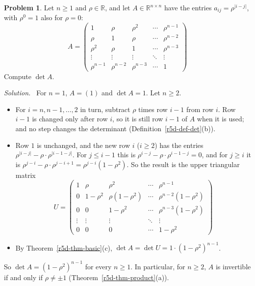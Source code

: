 \documentclass[12pt]{article}
\newcommand{\R}{\mathbb R}
\theoremstyle{definition}
\newtheorem{problem}{Problem}
\newenvironment{solution}{\par\noindent\textit{Solution.}\ }{\par\smallskip}
\begin{document}
\begin{problem}\label{r5d-ex-pr-ar1}
Let \(n\geqslant1\) and \(\rho\in\R\), and let \(A\in\R^{n\times n}\) have the entries \(a_{ij}=\rho^{\lvert i-j\rvert}\), with
\(\rho^0=1\) also for \(\rho=0\):
\[
A=\begin{pmatrix}1&\rho&\rho^2&\cdots&\rho^{n-1}\\\rho&1&\rho&\cdots&\rho^{n-2}\\\rho^2&\rho&1&\cdots&\rho^{n-3}\\
\vdots&\vdots&\vdots&\ddots&\vdots\\\rho^{n-1}&\rho^{n-2}&\rho^{n-3}&\cdots&1\end{pmatrix}
\]
Compute \(\det A\).
\end{problem}
\begin{solution}
For \(n=1\), \(A=(1)\) and \(\det A=1\). Let \(n\geqslant2\).
\begin{itemize}
\item For \(i=n,n-1,\dots,2\) in turn, subtract \(\rho\) times row \(i-1\) from row \(i\). Row \(i-1\) is changed only after
row \(i\), so it is still row \(i-1\) of \(A\) when it is used; and no step changes the determinant
(Definition~\ref{r5d-def-det}(b)).
\item Row \(1\) is unchanged, and the new row \(i\) (\(i\geqslant2\)) has the entries
\(\rho^{\lvert i-j\rvert}-\rho\cdot\rho^{\lvert i-1-j\rvert}\). For \(j\leqslant i-1\) this is
\(\rho^{i-j}-\rho\cdot\rho^{i-1-j}=0\), and for \(j\geqslant i\) it is \(\rho^{j-i}-\rho\cdot\rho^{j-i+1}=\rho^{j-i}(1-\rho^2)\).
So the result is the upper triangular matrix
\[
U=\begin{pmatrix}1&\rho&\rho^2&\cdots&\rho^{n-1}\\0&1-\rho^2&\rho(1-\rho^2)&\cdots&\rho^{n-2}(1-\rho^2)\\
0&0&1-\rho^2&\cdots&\rho^{n-3}(1-\rho^2)\\\vdots&\vdots&\vdots&\ddots&\vdots\\0&0&0&\cdots&1-\rho^2\end{pmatrix}
\]
\item By Theorem~\ref{r5d-thm-basic}(c), \(\det A=\det U=1\cdot(1-\rho^2)^{n-1}\).
\end{itemize}
So \(\det A=(1-\rho^2)^{n-1}\) for every \(n\geqslant1\). In particular, for \(n\geqslant2\), \(A\) is invertible if and only
if \(\rho\ne\pm1\) (Theorem~\ref{r5d-thm-product}(a)).
\end{solution}
\end{document}
